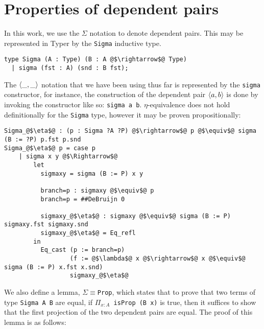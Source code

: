 \documentclass[12pt,twoside,maitrise]{dms}
\theoremstyle{definition}
\numberwithin{equation}{section}
\numberwithin{table}{chapter}
\numberwithin{figure}{chapter}
\newcommand\id[1] {\texttt{#1}}
\newcommand\fn[1] {\texttt{#1}}
\begin{document}
\section{Properties of dependent pairs}\label{app:deppairs-properties}
In this work, we use the $\Sigma$ notation to denote dependent pairs. This may
be represented in Typer by the \id{Sigma} inductive type.


\begin{verbatim}
type Sigma (A : Type) (B : A @$\rightarrow$@ Type)
  | sigma (fst : A) (snd : B fst);
\end{verbatim}

The $\braket{\_, \_}$ notation that we have been using thus far is represented
by the \id{sigma} constructor, for instance, the construction of the dependent
pair $\braket{a, b}$ is done by invoking the constructor like so: \fn{sigma a
  b}. $\eta$-equivalence does not hold definitionally for the \id{Sigma} type,
however it may be proven propositionally:

\begin{verbatim}
Sigma_@$\eta$@ : (p : Sigma ?A ?P) @$\rightarrow$@ p @$\equiv$@ sigma (B := ?P) p.fst p.snd
Sigma_@$\eta$@ p = case p
    | sigma x y @$\Rightarrow$@
        let
          sigmaxy = sigma (B := P) x y

          branch=p : sigmaxy @$\equiv$@ p
          branch=p = ##DeBruijn 0

          sigmaxy_@$\eta$@ : sigmaxy @$\equiv$@ sigma (B := P) sigmaxy.fst sigmaxy.snd
          sigmaxy_@$\eta$@ = Eq_refl
        in
          Eq_cast (p := branch=p)
                  (f := @$\lambda$@ x @$\rightarrow$@ x @$\equiv$@ sigma (B := P) x.fst x.snd)
                  sigmaxy_@$\eta$@
\end{verbatim}

We also define a lemma, \id{$\Sigma${}$\equiv${}Prop}, which states that to
prove that two terms of type \fn{Sigma A B} are equal, if \fn{$\Pi_{x : A}$ isProp
  (B x)} is true, then it suffices to show that the first projection of the two
dependent pairs are equal. The proof of this lemma is as follows:
\end{document}
